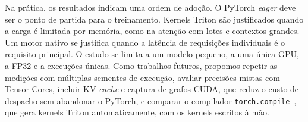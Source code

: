 \documentclass[conference]{IEEEtran}
\begin{document}
Na prática, os resultados indicam uma ordem de adoção. O PyTorch \textit{eager} deve ser o ponto de partida para o treinamento. Kernels Triton são justificados quando a carga é limitada por memória, como na atenção com lotes e contextos grandes. Um motor nativo se justifica quando a latência de requisições individuais é o requisito principal. O estudo se limita a um modelo pequeno, a uma única GPU, a FP32 e a execuções únicas. Como trabalhos futuros, propomos repetir as medições com múltiplas sementes de execução, avaliar precisões mistas com Tensor Cores, incluir KV-\textit{cache} e captura de grafos CUDA, que reduz o custo de despacho sem abandonar o PyTorch, e comparar o compilador \texttt{torch.compile}~\cite{ansel2024pytorch2}, que gera kernels Triton automaticamente, com os kernels escritos à mão.

\end{document}
